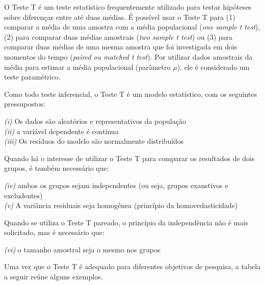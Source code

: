 \documentclass[
]{book}
\begin{document}
O Teste T é um teste estatístico frequentemente utilizado para testar hipóteses sobre diferenças entre até duas médias. É possível usar o Teste T para (1) comparar a média de uma amostra com a média populacional (\emph{one sample t test}), (2) para comparar duas médias amostrais (\emph{two sample t test}) ou (3) para comparar duas médias de uma mesma amostra que foi investigada em dois momentos do tempo (\emph{paired ou matched t test}). Por utilizar dados amostrais da média para estimar a média populacional (parâmetro \(\mu\)), ele é considerado um teste paramétrico.

Como todo teste inferencial, o Teste T é um modelo estatístico, com os seguintes pressupostos:

\emph{(i)} Os dados são aleatórios e representativos da população\\
\emph{(ii)} a variável dependente é contínua\\
\emph{(iii)} Os resíduos do modelo são normalmente distribuídos

Quando há o interesse de utilizar o Teste T para comparar os resultados de dois grupos, é também necessário que:

\emph{(iv)} ambos os grupos sejam independentes (ou seja, grupos exaustivos e excludentes)\\
\emph{(v)} A variância residuais seja homogênea (princípio da homocedasticidade)

Quando se utiliza o Teste T pareado, o princípio da independência não é mais solicitado, mas é necessário que:

\emph{(vi)} o tamanho amostral seja o mesmo nos grupos

Uma vez que o Teste T é adequado para diferentes objetivos de pesquisa, a tabela a seguir reúne alguns exemplos.
\end{document}
